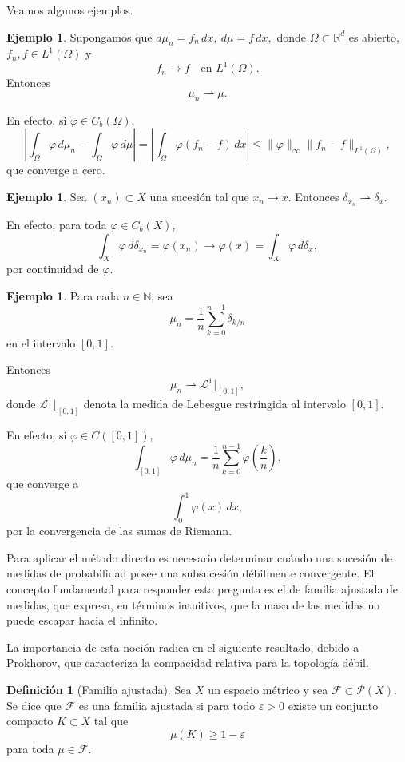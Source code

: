 \documentclass[12pt, a4paper]{amsbook}
\theoremstyle{remark}
\theoremstyle{definition}
\newtheorem{defi}[teo]{Definición}
\newtheorem{ejem}[teo]{Ejemplo}
\numberwithin{section}{chapter}
\numberwithin{subsection}{section}
\numberwithin{equation}{section}
\numberwithin{figure}{chapter}
\begin{document}
Veamos algunos ejemplos.
\begin{ejem}
Supongamos que
\(
d\mu_n=f_n\,dx,
\
d\mu=f\,dx,
\)
donde \(\Omega\subset\mathbb R^d\) es abierto, \(f_n,f\in L^1(\Omega)\) y
\[
f_n\longrightarrow f
\quad\text{en }L^1(\Omega).
\]
Entonces
\[
\mu_n\rightharpoonup\mu.
\]

En efecto, si \(\varphi\in C_b(\Omega)\),
\[
\left|
\int_\Omega\varphi\,d\mu_n-
\int_\Omega\varphi\,d\mu
\right|
=
\left|
\int_\Omega\varphi(f_n-f)\,dx
\right|
\le
\|\varphi\|_\infty
\|f_n-f\|_{L^1(\Omega)},
\]
que converge a cero.
\end{ejem}

\begin{ejem}
Sea \((x_n)\subset X\) una sucesión tal que
\(
x_n\longrightarrow x.
\)
Entonces
\(
\delta_{x_n}\rightharpoonup\delta_x.
\)

En efecto, para toda \(\varphi\in C_b(X)\),
\[
\int_X\varphi\,d\delta_{x_n}
=
\varphi(x_n)
\longrightarrow
\varphi(x)
=
\int_X\varphi\,d\delta_x,
\]
por continuidad de \(\varphi\).
\end{ejem}

\begin{ejem}
Para cada \(n\in\mathbb N\), sea
\[
\mu_n=
\frac1n
\sum_{k=0}^{n-1}
\delta_{k/n}
\]
en el intervalo \([0,1]\).

Entonces
\[
\mu_n\rightharpoonup\mathcal L^1\lfloor_{[0,1]},
\]
donde \(\mathcal L^1\lfloor_{[0,1]}\) denota la medida de Lebesgue restringida al intervalo \([0,1]\).

En efecto, si \(\varphi\in C([0,1])\),
\[
\int_{[0,1]}\varphi\,d\mu_n
=
\frac1n
\sum_{k=0}^{n-1}
\varphi\!\left(\frac{k}{n}\right),
\]
que converge a
\[
\int_0^1\varphi(x)\,dx,
\]
por la convergencia de las sumas de Riemann.
\end{ejem}

Para aplicar el método directo es necesario determinar cuándo una sucesión de medidas de probabilidad posee una subsucesión débilmente convergente. El concepto fundamental para responder esta pregunta es el de familia ajustada de medidas, que expresa, en términos intuitivos, que la masa de las medidas no puede escapar hacia el infinito.

La importancia de esta noción radica en el siguiente resultado, debido a Prokhorov, que caracteriza la compacidad relativa para la topología débil.

\begin{defi}[Familia ajustada]\label{def.ajustada}
Sea \(X\) un espacio métrico y sea \(\mathcal F\subset\mathcal P(X)\). Se dice que \(\mathcal F\) es una familia ajustada si para todo \(\varepsilon>0\) existe un conjunto compacto \(K\subset X\) tal que
\[
\mu(K)\ge 1-\varepsilon
\]
para toda \(\mu\in\mathcal F\).
\end{defi}
\end{document}
